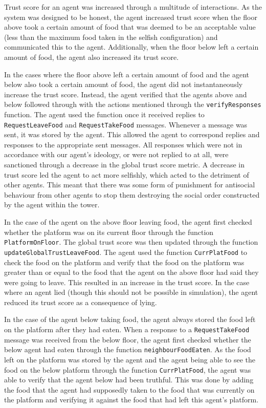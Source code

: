 Trust score for an agent was increased through a multitude of interactions. As the system was designed to be honest, the agent increased trust score when the floor above took a certain amount of food that was deemed to be an acceptable value (less than the maximum food taken in the selfish configuration) and communicated this to the agent. Additionally, when the floor below left a certain amount of food, the agent also increased its trust score.

In the cases where the floor above left a certain amount of food and the agent below also took a certain amount of food, the agent did not instantaneously increase the trust score. Instead, the agent verified that the agents above and below followed through with the actions mentioned through the \texttt{verifyResponses} function. The agent used the function once it received replies to \texttt{RequestLeaveFood} and \texttt{RequestTakeFood} messages. Whenever a message was sent, it was stored by the agent. This allowed the agent to correspond replies and responses to the appropriate sent messages. All responses which were not in accordance with our agent's ideology, or were not replied to at all, were sanctioned through a decrease in the global trust score metric. A decrease in trust score led the agent to act more selfishly, which acted to the detriment of other agents. This meant that there was some form of punishment for antisocial behaviour from other agents to stop them destroying the social order constructed by the agent within the tower.

In the case of the agent on the above floor leaving food, the agent first checked whether the platform was on its current floor through the function \texttt{PlatformOnFloor}. The global trust score was then updated through the function \texttt{updateGlobalTrustLeaveFood}. The agent used the function \texttt{CurrPlatFood} to check the food on the platform and verify that the food on the platform was greater than or equal to the food that the agent on the above floor had said they were going to leave. This resulted in an increase in the trust score. In the case where an agent lied (though this should not be possible in simulation), the agent reduced its trust score as a consequence of lying. 

In the case of the agent below taking food, the agent always stored the food left on the platform after they had eaten. When a response to a \texttt{RequestTakeFood} message was received from the below floor, the agent first checked whether the below agent had eaten through the function \texttt{neighbourFoodEaten}. As the food left on the platform was stored by the agent and the agent being able to see the food on the below platform through the function \texttt{CurrPlatFood}, the agent was able to verify that the agent below had been truthful. This was done by adding the food that the agent had supposedly taken to the food that was currently on the platform and verifying it against the food that had left this agent's platform.

